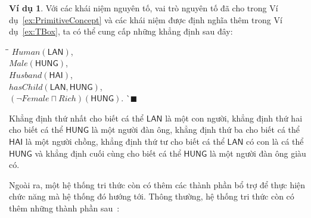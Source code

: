 \documentclass[12pt,a4paper,twoside]{report}
\newcommand{\myend}		{\mbox{}\hfill\mbox{{\scriptsize$\!\blacksquare$}}}
\newcommand{\mand}		{\sqcap}
\newcommand{\Human}			{Human}
\newcommand{\Female}		{Female}
\newcommand{\Male}			{Male}
\newcommand{\Rich}			{Rich}
\newcommand{\Husband}		{Husband}
\newcommand{\hasChild}		{hasChild}
\newcommand{\iLAN}		{\mathsf{LAN}}
\newcommand{\iHUNG}		{\mathsf{HUNG}}
\newcommand{\iHAI}		{\mathsf{HAI}}
\theoremstyle{definition}
\newtheorem{Example}{Ví dụ}[chapter]
\begin{document}
\begin{Example}\label{ex:ABox}
  Với các khái niệm nguyên tố, vai trò nguyên tố đã cho trong Ví dụ~\ref{ex:PrimitiveConcept} và các khái niệm được định nghĩa thêm trong Ví dụ~\ref{ex:TBox}, ta có thể cung cấp những khẳng định sau đây:
\begin{tabbing}
  \hspace*{.85cm}\=\hspace*{\textwidth}\=\kill
  \>$\Human(\iLAN)$,\\[0.5ex]
  \>$\Male(\iHUNG)$,\\[0.5ex]
  \>$\Husband(\iHAI)$,\\[0.5ex]
  \>$\hasChild(\iLAN, \iHUNG)$,\\[0.5ex]
  \>$(\neg \Female \mand \Rich)(\iHUNG)$. \`\myend
\end{tabbing}
\end{Example}

Khẳng định thứ nhất cho biết cá thể $\iLAN$ là một con người, khẳng định thứ hai cho biết cá thể $\iHUNG$ là một người đàn ông, khẳng định thứ ba cho biết cá thể $\iHAI$ là một người chồng, khẳng định thứ tư cho biết cá thể $\iLAN$ có con là cá thể $\iHUNG$ và khẳng định cuối cùng cho biết cá thể $\iHUNG$ là một người đàn ông giàu có.

Ngoài ra, một hệ thống tri thức còn có thêm các thành phần bổ trợ để thực hiện chức năng mà hệ thống đó hướng tới. Thông thường, hệ thống tri thức còn có thêm những thành phần sau~\cite{DLHandbook2007}:
\end{document}
